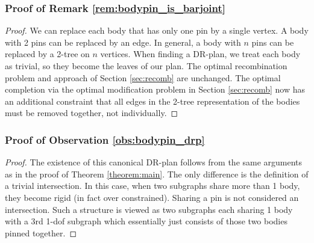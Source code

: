 \subsubsection{Proof of Remark \ref{rem:bodypin_is_barjoint}}
\begin{proof}
    We can replace each body that has only one pin by a single vertex. A body with 2 pins can be replaced by an edge. In general, a body with $n$ pins can be replaced by a 2-tree on $n$ vertices. When finding a DR-plan, we treat each body as trivial, so they become the leaves of our plan. The optimal recombination problem and approach of Section \ref{sec:recomb} are unchanged. The optimal completion via the optimal modification problem in Section \ref{sec:recomb} now has an additional constraint that all edges in the 2-tree representation of the bodies must be removed together, not individually.
\end{proof}

\subsubsection{Proof of Observation \ref{obs:bodypin_drp}}
\begin{proof}
    The existence of this canonical DR-plan follows from the same arguments as in the proof of Theorem \ref{theorem:main}. The only difference is the definition of a trivial intersection. In this case, when two subgraphs share more than 1 body, they become rigid (in fact over constrained). Sharing a pin is not considered an intersection. Such a structure is viewed as two subgraphs each sharing 1 body with a 3rd 1-dof subgraph which essentially just consists of those two bodies pinned together.
\end{proof}


